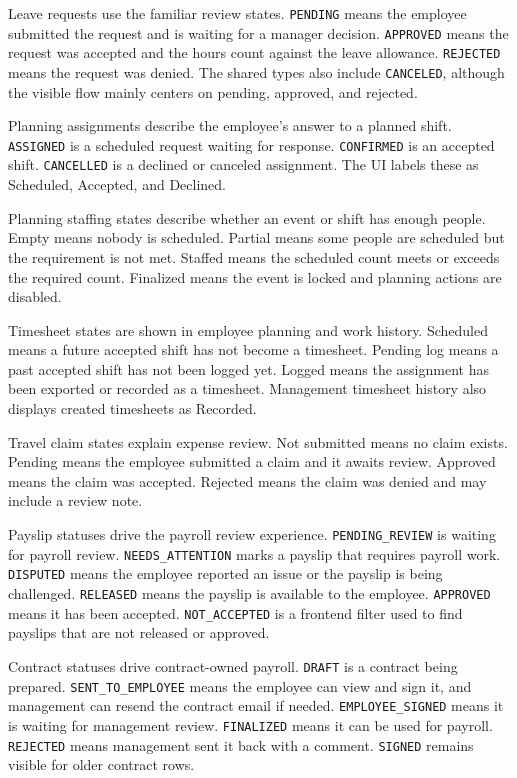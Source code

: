 \documentclass[11pt]{article}
\newcommand{\code}[1]{\nolinkurl{#1}}
\begin{document}
Leave requests use the familiar review states. \code{PENDING} means the employee submitted the request and is waiting for a manager decision. \code{APPROVED} means the request was accepted and the hours count against the leave allowance. \code{REJECTED} means the request was denied. The shared types also include \code{CANCELED}, although the visible flow mainly centers on pending, approved, and rejected.

Planning assignments describe the employee's answer to a planned shift. \code{ASSIGNED} is a scheduled request waiting for response. \code{CONFIRMED} is an accepted shift. \code{CANCELLED} is a declined or canceled assignment. The UI labels these as Scheduled, Accepted, and Declined.

Planning staffing states describe whether an event or shift has enough people. Empty means nobody is scheduled. Partial means some people are scheduled but the requirement is not met. Staffed means the scheduled count meets or exceeds the required count. Finalized means the event is locked and planning actions are disabled.

Timesheet states are shown in employee planning and work history. Scheduled means a future accepted shift has not become a timesheet. Pending log means a past accepted shift has not been logged yet. Logged means the assignment has been exported or recorded as a timesheet. Management timesheet history also displays created timesheets as Recorded.

Travel claim states explain expense review. Not submitted means no claim exists. Pending means the employee submitted a claim and it awaits review. Approved means the claim was accepted. Rejected means the claim was denied and may include a review note.

Payslip statuses drive the payroll review experience. \code{PENDING_REVIEW} is waiting for payroll review. \code{NEEDS_ATTENTION} marks a payslip that requires payroll work. \code{DISPUTED} means the employee reported an issue or the payslip is being challenged. \code{RELEASED} means the payslip is available to the employee. \code{APPROVED} means it has been accepted. \code{NOT_ACCEPTED} is a frontend filter used to find payslips that are not released or approved.

Contract statuses drive contract-owned payroll. \code{DRAFT} is a contract being prepared. \code{SENT_TO_EMPLOYEE} means the employee can view and sign it, and management can resend the contract email if needed. \code{EMPLOYEE_SIGNED} means it is waiting for management review. \code{FINALIZED} means it can be used for payroll. \code{REJECTED} means management sent it back with a comment. \code{SIGNED} remains visible for older contract rows.
\end{document}
